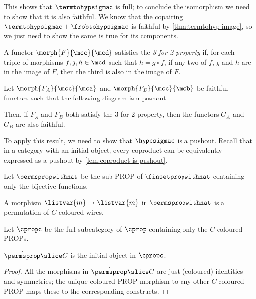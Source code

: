 This shows that \(\termtohypsigmac\) is full; to conclude the isomorphism we
need to show that it is also faithful.
We know that the copairing \(\termtohypsigmac + \frobtohypsigmac\) is faithful
by \cref{thm:termtohyp-image}, so we just need to show the same is true for its
components.


\begin{definition}
    A functor \(\morph{F}{\mcc}{\mcd}\) satisfies the \emph{3-for-2 property}
    if, for each triple of morphisms \(f,g,h \in \mcd\) such that
    \(h = g \circ f\), if any two of \(f\), \(g\) and \(h\) are in the image of
    \(F\), then the third is also in the image of \(F\).
\end{definition}

\begin{theorem}
    \label{thm:faithful-pushout}
    Let \(\morph{F_A}{\mcc}{\mca}\) and \(\morph{F_B}{\mcc}{\mcb}\) be faithful
    functors such that the following diagram is a pushout.
    \begin{center}
        
    \end{center}
    Then, if \(F_A\) and \(F_B\) both satisfy the 3-for-2 property, then the
    functors \(G_A\) and \(G_B\) are also faithful.
\end{theorem}

To apply this result, we need to show that \(\hypcsigmac\) is a pushout.
Recall that in a category with an initial object, every coproduct can be
equivalently expressed as a pushout by \cref{lem:coproduct-is-pushout}.

\begin{definition}
    Let \(\permspropwithnat\) be the sub-PROP of \(\finsetpropwithnat\)
    containing only the bijective functions.
\end{definition}

A morphism \(\listvar{m} \to \listvar{m}\) in \(\permspropwithnat\) is a
permutation of \(C\)-coloured wires.

\begin{definition}
    Let \(\cpropc\) be the full subcategory of \(\cprop\) containing only the
    \(C\)-coloured PROPs.
\end{definition}

\begin{lemma}
    \label{cpropc-initial}
    \(\hat{\permsprop} \slice C\) is the initial object in \(\cpropc\).
\end{lemma}
\begin{proof}
    All the morphisms in \(\hat{\permsprop} \slice C\) are just (coloured)
    identities and symmetries; the unique coloured PROP morphism to any other
    \(C\)-coloured PROP maps these to the corresponding constructs.
\end{proof}

